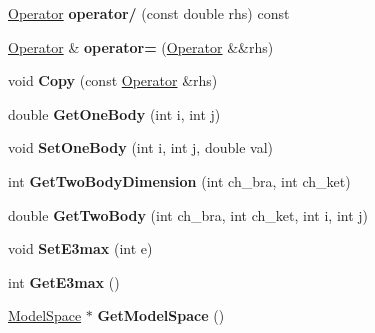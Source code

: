 \begin{DoxyCompactItemize}
\item 
\hypertarget{classOperator_a60c6e3fa8da186a1183e540e6ff04421}{\hyperlink{classOperator}{Operator} {\bfseries operator/} (const double rhs) const }\label{classOperator_a60c6e3fa8da186a1183e540e6ff04421}

\item 
\hypertarget{classOperator_ab1d24f45c7e10139e41084c8dc7f34ec}{\hyperlink{classOperator}{Operator} \& {\bfseries operator=} (\hyperlink{classOperator}{Operator} \&\&rhs)}\label{classOperator_ab1d24f45c7e10139e41084c8dc7f34ec}

\item 
\hypertarget{classOperator_a851708e76dd24603d0527f6c5c1bd544}{void {\bfseries Copy} (const \hyperlink{classOperator}{Operator} \&rhs)}\label{classOperator_a851708e76dd24603d0527f6c5c1bd544}

\item 
\hypertarget{classOperator_a34eb5fa0e6d415cd44e1a3034d1cf5c0}{double {\bfseries Get\-One\-Body} (int i, int j)}\label{classOperator_a34eb5fa0e6d415cd44e1a3034d1cf5c0}

\item 
\hypertarget{classOperator_ae85aa3d8fdaeb3cb6266c3a4494e904b}{void {\bfseries Set\-One\-Body} (int i, int j, double val)}\label{classOperator_ae85aa3d8fdaeb3cb6266c3a4494e904b}

\item 
\hypertarget{classOperator_aa2b42d5c6afffc790b9a7466787d7237}{int {\bfseries Get\-Two\-Body\-Dimension} (int ch\-\_\-bra, int ch\-\_\-ket)}\label{classOperator_aa2b42d5c6afffc790b9a7466787d7237}

\item 
\hypertarget{classOperator_a5ef7a48c8c873a79ff695a6b71d83803}{double {\bfseries Get\-Two\-Body} (int ch\-\_\-bra, int ch\-\_\-ket, int i, int j)}\label{classOperator_a5ef7a48c8c873a79ff695a6b71d83803}

\item 
\hypertarget{classOperator_a8b32ed75e5e0d6175a2f2f517c63a89c}{void {\bfseries Set\-E3max} (int e)}\label{classOperator_a8b32ed75e5e0d6175a2f2f517c63a89c}

\item 
\hypertarget{classOperator_a42d67df774701e40e2c49e539a68c937}{int {\bfseries Get\-E3max} ()}\label{classOperator_a42d67df774701e40e2c49e539a68c937}

\item 
\hypertarget{classOperator_aeacbeb2efba4199ad20291b50f03f4f6}{\hyperlink{classModelSpace}{Model\-Space} $\ast$ {\bfseries Get\-Model\-Space} ()}\label{classOperator_aeacbeb2efba4199ad20291b50f03f4f6}


\end{DoxyCompactItemize}
